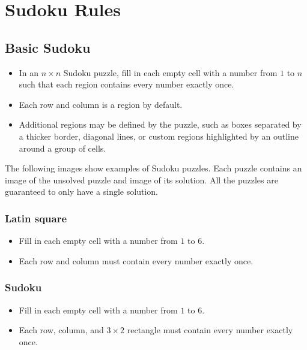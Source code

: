 \chapter{Sudoku Rules}\label{ch:chap-1}

\section{Basic Sudoku}

\begin{itemize}
    \item In an $n \times n$ Sudoku puzzle, fill in each empty cell with a number from $1$ to $n$
    such that each region contains every number exactly once.
    \item Each row and column is a region by default.
    \item Additional regions may be defined by the puzzle, such as boxes separated by a thicker border,
    diagonal lines, or custom regions highlighted by an outline around a group of cells.
\end{itemize}

The following images show examples of Sudoku puzzles.
Each puzzle contains an image of the unsolved puzzle and image of its solution.
All the puzzles are guaranteed to only have a single solution.

\subsection*{Latin square}
\begin{itemize}
    \item Fill in each empty cell with a number from $1$ to $6$.
    \item Each row and column must contain every number exactly once.
\end{itemize}

\subsection*{Sudoku}
\begin{itemize}
    \item Fill in each empty cell with a number from $1$ to $6$.
    \item Each row, column, and $3 \times 2$ rectangle must contain every number exactly once.
\end{itemize}

